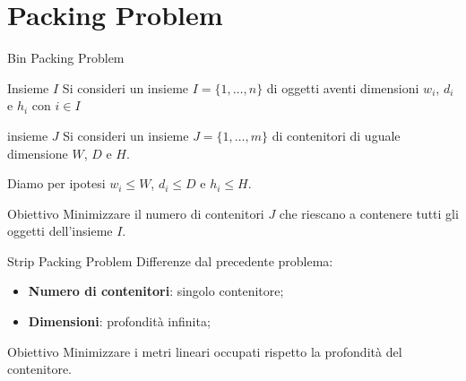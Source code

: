 \documentclass{beamer}
\begin{document}
\section{Packing Problem}
\begin{frame}{Bin Packing Problem}
	\begin{block}{Insieme $I$}
		Si consideri un insieme $I = \{1,\dots,n\}$ di oggetti aventi dimensioni $w_{i}$, $d_{i}$ e $h_{i}$ con $i \in I$	
	\end{block}
	\begin{block}{insieme $J$}
		Si consideri un insieme $J = \{1,\dots,m\}$ di contenitori di uguale dimensione $W$, $D$ e $H$.
	\end{block}
	Diamo per ipotesi $w_{i} \leq W$, $d_{i} \leq D$ e $h_{i} \leq H$.
	\begin{alertblock}{Obiettivo}
		Minimizzare il numero di contenitori $J$ che riescano a contenere tutti gli oggetti dell'insieme $I$.
	\end{alertblock}
\end{frame}

\begin{frame}{Strip Packing Problem}
	Differenze dal precedente problema:\vspace{.5em}
	\begin{itemize}
		\item \textbf{Numero di contenitori}: singolo contenitore;
		\item \textbf{Dimensioni}: profondit\`a infinita;
	\end{itemize}
	\begin{alertblock}{Obiettivo}
		Minimizzare i metri lineari occupati rispetto la profondit\`a del contenitore.
	\end{alertblock}
\end{frame}
\end{document}
